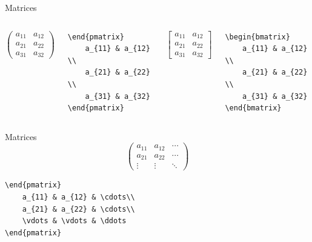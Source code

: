 \documentclass[../slides.tex]{subfiles}
\begin{document}
    \begin{frame}[fragile]{Matrices}
        \begin{columns}
                \[ \begin{pmatrix}
                        a_{11} & a_{12} \\
                        a_{21} & a_{22} \\  
                        a_{31} & a_{32}
                    \end{pmatrix}
                \] 
\begin{verbatim}
\end{pmatrix}
    a_{11} & a_{12} \\
    a_{21} & a_{22} \\  
    a_{31} & a_{32}
\end{pmatrix}
\end{verbatim}
                
                \[ \begin{bmatrix}
                        a_{11} & a_{12} \\
                        a_{21} & a_{22} \\  
                        a_{31} & a_{32}
                    \end{bmatrix}
                \] 
\begin{verbatim}
\begin{bmatrix}
    a_{11} & a_{12} \\
    a_{21} & a_{22} \\  
    a_{31} & a_{32}
\end{bmatrix}
\end{verbatim}
        \end{columns}
    \end{frame}
    
    \begin{frame}[fragile]{Matrices}
        \[ \begin{pmatrix}
                        a_{11} & a_{12} & \cdots\\
                        a_{21} & a_{22} & \cdots\\  
                        \vdots & \vdots & \ddots
                    \end{pmatrix}
                \] 
\begin{verbatim}
\end{pmatrix}
    a_{11} & a_{12} & \cdots\\
    a_{21} & a_{22} & \cdots\\  
    \vdots & \vdots & \ddots
\end{pmatrix}
\end{verbatim}
    \end{frame}
\end{document}
